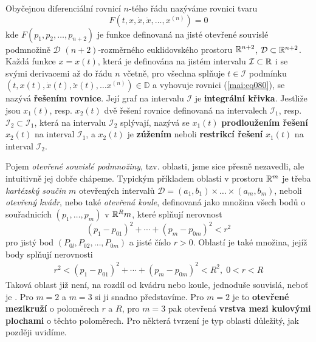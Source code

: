   \begin{mdframed}[style=mdmathdef]
    \begin{definition}\label{mai:eq080}
      Obyčejnou diferenciální rovnicí \(n\)-tého řádu nazýváme rovnici tvaru 
      \begin{equation}\label{mai:eq091}
        F(t, x, \dot{x}, \ddot{x}, \ldots,x^{(n)}) = 0
      \end{equation}
      kde \(F(p_1, p_2, \ldots, p_{n+2})\) je funkce definovaná na jisté otevřené souvislé
      podmnožině \(\mathcal{D}\) \((n+2)\)-rozměrného euklidovského prostoru \(\mathbb{R}^{n+2}\),
      \(\mathcal{D}\subset \mathbb{R}^{n+2}\). Každá funkce \(x = x(t)\), která je definována na
      jistém intervalu \(\mathcal{I} \subset\mathbb{R}\) i se svými derivacemi až do řádu \(n\)
      včetně, pro všechna  splňuje \(t\in\mathcal{I}\) podmínku \((t, x(t), \dot{x}(t), \ddot{x}(t),
      \ldots x^{(n)}) \in\mathbb{D}\) a vyhovuje rovnici (\ref{mai:eq080}), se nazývá
      \textbf{řešením rovnice}. Její graf na intervalu \(\mathcal{I}\) je \textbf{integrální
      křivka}. Jestliže jsou \(x_1(t)\), resp. \(x_2(t)\) dvě řešení rovnice definovaná na
      intervalech \(\mathcal{I}_1\), resp. \(\mathcal{I}_2 \subset \mathcal{I}_1\), která na
      intervalu \(\mathcal{I}_2\) splývají, nazývá se \(x_1(t)\) \textbf{prodloužením řešení}
      \(x_2(t)\) na interval \(\mathcal{I}_1\), a \(x_2(t)\) je \textbf{zúžením} neboli
      \textbf{restrikcí řešení} \(x_1(t)\) na interval \(\mathcal{I}_2\).
    \end{definition}
  \end{mdframed}
  
  \begin{mdframed}[style=mdnote]     
    Pojem \emph{otevřené souvislé podmnožiny}, tzv. oblasti, jsme sice přesně nezavedli, ale
    intuitivně jej dobře chápeme. Typickým příkladem oblasti v prostoru \(\mathbb{R}^m\) je třeba
    \emph{kartézský součin} \(m\) otevřených intervalů \(\mathcal{D} = (a_1,b_1) \times\ldots\times
    (a_m, b_m)\), neboli \emph{otevřený kvádr}, nebo také \emph{otevřená koule}, definovaná jako
    množina všech bodů o souřadnicích \((p_1,\ldots, p_m)\) v \(\mathbb{R}^Rm\), které splňují
    nerovnost 
    \begin{equation*}
      (p_1 - p_{01})^2 + \cdots + (p_m - p_{0m})^2 < r^2
    \end{equation*}
    pro jistý bod \((P_{0l}, P_{02}, \ldots, P_{0m})\) a jisté číslo \(r > 0\). Oblastí je také
    množina, jejíž body splňují nerovnosti
    \begin{gather*}
      r^2 < (p_1 - p_{01})^2 + \cdots + (p_m - p_{0m})^2 < R^2, \; 0 < r < R
    \end{gather*}
    Taková oblast již není, na rozdíl od kvádru nebo koule, jednoduše souvislá, neboť je
    . Pro \(m = 2\) a \(m = 3\) si ji snadno představíme. Pro \(m = 2\) je to
    \textbf{otevřené mezikruží} o poloměrech \(r\) a \(R\), pro \(m = 3\) pak otevřená
    \textbf{vrstva mezi kulovými plochami} o těchto poloměrech. Pro některá tvrzení je typ oblasti
    důležitý, jak později uvidíme. 
  \end{mdframed}


